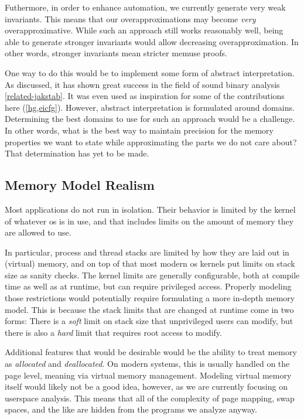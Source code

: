 Futhermore, in order to enhance automation, we currently generate very weak invariants.
This means that our overapproximations may become \emph{very} overapproximative.
While such an approach still works reasonably well, being able to generate stronger invariants would allow decreasing overapproximation.
In other words, stronger invariants mean stricter \gls{memuse} proofs.

One way to do this would be to implement some form of abstract interpretation. %
As discussed, it has shown great success in the field of sound binary analysis \cref{related-jakstab}. %
It was even used as inspiration for some of the contributions here (\cref{hg,eicfg}).
However, abstract interpretation is formulated around domains.
Determining the best domains to use for such an approach would be a challenge.
In other words, what is the best way to maintain precision for the memory properties we want to state while approximating the parts we do not care about?
That determination has yet to be made.

\subsection{Memory Model Realism}
Most applications do not run in isolation.
Their behavior is limited by the kernel of whatever \gls{os} is in use, and that includes limits on the amount of memory they are allowed to use.

In particular, process and thread stacks are limited by how they are laid out in (virtual) memory, and on top of that most modern \gls{os} kernels put limits on stack size as sanity checks.
The kernel limits are generally configurable, both at compile time as well as at runtime, but can require privileged access.
Properly modeling those restrictions would potentially require formulating a more in-depth memory model.
This is because the stack limits that are changed at runtime come in two forms:
There is a \emph{soft} limit on stack size that unprivileged users can modify, but there is also a \emph{hard} limit that requires root access to modify.

Additional features that would be desirable would be the ability to treat memory as \emph{allocated} and \emph{deallocated}.
On modern systems, this is usually handled on the page level, meaning via virtual memory management.
Modeling virtual memory itself would likely not be a good idea, however, as we are currently focusing on userspace analysis.
This means that all of the complexity of page mapping, swap spaces, and the like are hidden from the programs we analyze anyway.

